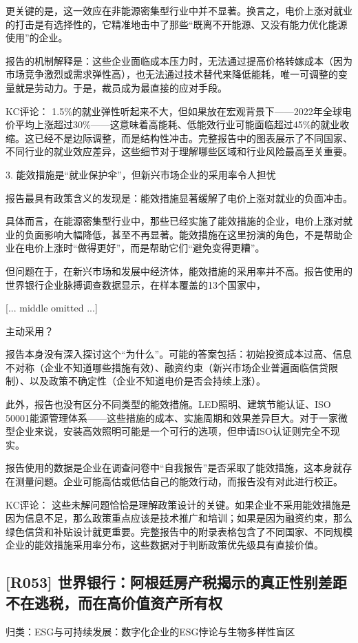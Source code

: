 \documentclass[11pt]{ctexart}
\begin{document}
更关键的是，这一效应在非能源密集型行业中并不显著。换言之，电价上涨对就业的打击是有选择性的，它精准地击中了那些“既离不开能源、又没有能力优化能源使用”的企业。

报告的机制解释是：这些企业面临成本压力时，无法通过提高价格转嫁成本（因为市场竞争激烈或需求弹性高），也无法通过技术替代来降低能耗，唯一可调整的变量就是劳动力。于是，裁员成为最直接的应对手段。

KC评论： 1.5\%的就业弹性听起来不大，但如果放在宏观背景下——2022年全球电价平均上涨超过30\%——这意味着高能耗、低能效行业可能面临超过45\%的就业收缩。这已经不是边际调整，而是结构性冲击。完整报告中的图表展示了不同国家、不同行业的就业效应差异，这些细节对于理解哪些区域和行业风险最高至关重要。

3. 能效措施是“就业保护伞”，但新兴市场企业的采用率令人担忧

报告最具有政策含义的发现是：能效措施显著缓解了电价上涨对就业的负面冲击。

具体而言，在能源密集型行业中，那些已经实施了能效措施的企业，电价上涨对就业的负面影响大幅降低，甚至不再显著。能效措施在这里扮演的角色，不是帮助企业在电价上涨时“做得更好”，而是帮助它们“避免变得更糟”。

但问题在于，在新兴市场和发展中经济体，能效措施的采用率并不高。报告使用的世界银行企业脉搏调查数据显示，在样本覆盖的13个国家中，

[... middle omitted ...]

主动采用？

报告本身没有深入探讨这个“为什么”。可能的答案包括：初始投资成本过高、信息不对称（企业不知道哪些措施有效）、融资约束（新兴市场企业普遍面临信贷限制）、以及政策不确定性（企业不知道电价是否会持续上涨）。

此外，报告也没有区分不同类型的能效措施。LED照明、建筑节能认证、ISO 50001能源管理体系——这些措施的成本、实施周期和效果差异巨大。对于一家微型企业来说，安装高效照明可能是一个可行的选项，但申请ISO认证则完全不现实。

报告使用的数据是企业在调查问卷中“自我报告”是否采取了能效措施，这本身就存在测量问题。企业可能高估或低估自己的能效行动，而报告没有对此进行校正。

KC评论： 这些未解问题恰恰是理解政策设计的关键。如果企业不采用能效措施是因为信息不足，那么政策重点应该是技术推广和培训；如果是因为融资约束，那么绿色信贷和补贴设计就更重要。完整报告中的附录表格包含了不同国家、不同规模企业的能效措施采用率分布，这些数据对于判断政策优先级具有直接价值。

\subsection{[R053] 世界银行：阿根廷房产税揭示的真正性别差距不在逃税，而在高价值资产所有权}
{\small\color{refgray}归类：ESG与可持续发展：数字化企业的ESG悖论与生物多样性盲区}
\end{document}
